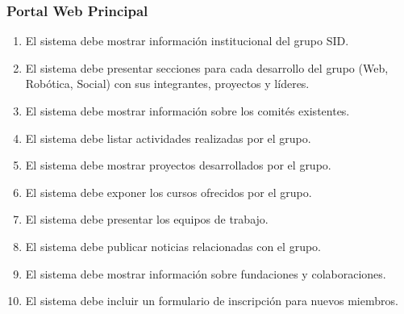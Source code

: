 \documentclass[11pt,a4paper]{article}
\newcommand{\reqnum}[1]{\textbf{\underline{RF-#1}}}
\begin{document}
\subsubsection{Portal Web Principal}
\begin{enumerate}[leftmargin=*,labelwidth=2.5cm,align=left]
	\item[\reqnum{001}] El sistema debe mostrar información institucional del grupo SID.
	\item[\reqnum{002}] El sistema debe presentar secciones para cada desarrollo del grupo (Web, Robótica, Social) con sus integrantes, proyectos y líderes.
	\item[\reqnum{003}] El sistema debe mostrar información sobre los comités existentes.
	\item[\reqnum{004}] El sistema debe listar actividades realizadas por el grupo.
	\item[\reqnum{005}] El sistema debe mostrar proyectos desarrollados por el grupo.
	\item[\reqnum{006}] El sistema debe exponer los cursos ofrecidos por el grupo.
	\item[\reqnum{007}] El sistema debe presentar los equipos de trabajo.
	\item[\reqnum{008}] El sistema debe publicar noticias relacionadas con el grupo.
	\item[\reqnum{009}] El sistema debe mostrar información sobre fundaciones y colaboraciones.
	\item[\reqnum{010}] El sistema debe incluir un formulario de inscripción para nuevos miembros.
\end{enumerate}
\end{document}
